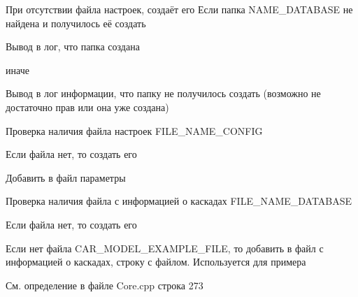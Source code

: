При отсутствии файла настроек, создаёт его Если папка N\+A\+M\+E\+\_\+\+D\+A\+T\+A\+B\+A\+SE не найдена и получилось её создать \begin{DoxyVerb}Вывод в лог, что папка создана
\end{DoxyVerb}


иначе \begin{DoxyVerb}Вывод в лог информации, что папку не получилось создать (возможно не достаточно прав или она уже создана)
\end{DoxyVerb}


Проверка наличия файла настроек F\+I\+L\+E\+\_\+\+N\+A\+M\+E\+\_\+\+C\+O\+N\+F\+IG

Если файла нет, то создать его \begin{DoxyVerb}Добавить в файл параметры
\end{DoxyVerb}


Проверка наличия файла с информацией о каскадах F\+I\+L\+E\+\_\+\+N\+A\+M\+E\+\_\+\+D\+A\+T\+A\+B\+A\+SE

Если файла нет, то создать его

Если нет файла C\+A\+R\+\_\+\+M\+O\+D\+E\+L\+\_\+\+E\+X\+A\+M\+P\+L\+E\+\_\+\+F\+I\+LE, то добавить в файл с информацией о каскадах, строку с файлом. Используется для примера 

См. определение в файле Core.\+cpp строка 273

